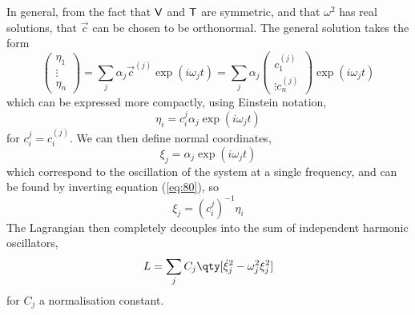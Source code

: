In general, from the fact that $\mathsf{V}$ and $\mathsf{T}$ are symmetric,
and that $\omega^2$ has real solutions, that $\vec{c}$ can be chosen
to be orthonormal. The general solution takes the form
\begin{equation}
  \label{eq:80}
  \begin{pmatrix}
    \eta_1 \\ \vdots \\ \eta_n
  \end{pmatrix}
 = \sum_j \alpha_j \vec{c}^{(j)} \exp( i \omega_j t) = \sum_j \alpha_j 
 \begin{pmatrix}
   c_1^{(j)} \\ \vdots c_n^{(j)}
 \end{pmatrix}
\exp(i \omega_j t)
\end{equation}
which can be expressed more compactly, using Einstein notation,
\begin{equation}
\label{eq:81}
 \eta_i = c_i^j \alpha_j \exp(i \omega_j t)
\end{equation}
for $c_i^j = c_i^{(j)}$. We can then define normal coordinates,
\[ \xi_j = \alpha_j \exp(i \omega_j t) \] which correspond to the
oscillation of the system at a single frequency, and can be found by
inverting equation (\ref{eq:80}), so
\begin{equation}
  \label{eq:82}
  \xi_j = (c_i^j)^{-1} \eta_i
\end{equation}
The Lagrangian then completely decouples into the sum of independent
harmonic oscillators,
\begin{equation}
  \label{eq:87}
  L = \sum_j C_j \qty[ \dot{\xi}_j^2 - \omega^2_j \xi_j^2]
\end{equation}
for $C_j$ a normalisation constant.


